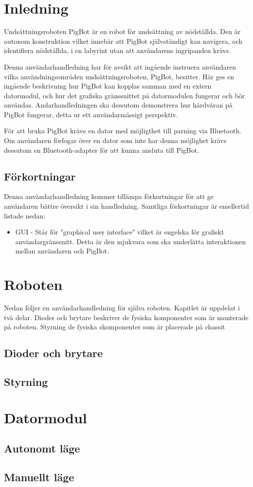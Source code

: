 \documentclass[11pt]{article}
\begin{document}
\pagebreak
\section{Inledning}
Undsättningsroboten PigBot är en robot för undsättning av nödställda. Den är autonom konstruktion vilket innebär att PigBot självständigt kan navigera, och identifiera nödställda, i en labyrint utan att användarens ingripanden krävs.

Denna användarhandledning har för avsikt att ingående instruera användaren vilka användningsområden undsättningsroboten, PigBot, besitter. Här ges en ingående beskrivning hur PigBot kan kopplas samman med en extern datormodul, och hur det grafiska gränssnittet på datormodulen fungerar och bör användas. Andarhandledningen ska dessutom demonstrera hur hårdvåran på PigBot fungerar, detta ur ett användarmässigt perspektiv. 

För att bruka PigBot krävs en dator med möjligthet till parning via Bluetooth\textsuperscript{\circledR}. Om användaren förfogar över en dator som inte har denna möjlighet krävs dessutom en Bluetooth\textsuperscript{\circledR}-adapter för att kunna ansluta till PigBot.

\subsection{Förkortningar}
Denna användarhandledning kommer tillämpa förkortningar för att ge användaren bättre översikt i sin handledning. Samtliga förkortningar är emellertid listade nedan:

\begin{itemize}
\item GUI - Står för "graphical user interface" vilket är engelska för grafiskt användargränssnitt. Detta är den mjukvara som ska underlätta interaktionen mellan användaren och PigBot.
\end{itemize}

\section{Roboten}
Nedan följer en användarhandledning för själva roboten. Kapitlet är uppdelat i två delar. Dioder och brytare beskriver de fysiska komponenter som är monterade på roboten. Styrning de fysiska skomponenter som är placerade på chassit 
\subsection{Dioder och brytare}

\subsection{Styrning}


\section{Datormodul}
\subsection{Autonomt läge}
\subsection{Manuellt läge}

\end{document}

